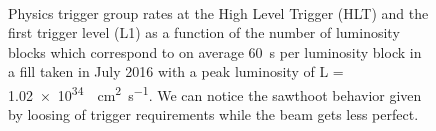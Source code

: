 \begin{figure}[t]
\centering
{} \\


\caption{Physics trigger group rates at the High Level Trigger (HLT) and the first trigger level (L1) as a function of the number of luminosity blocks which correspond to on average \SI{60}{\s} per luminosity block in a fill taken in July 2016 with a peak luminosity of L = \SI{1.02 e34}{\per\cm\squared\per\s}. We can notice the sawthoot behavior given by loosing of trigger requirements while the beam gets less perfect.}
\end{figure}





